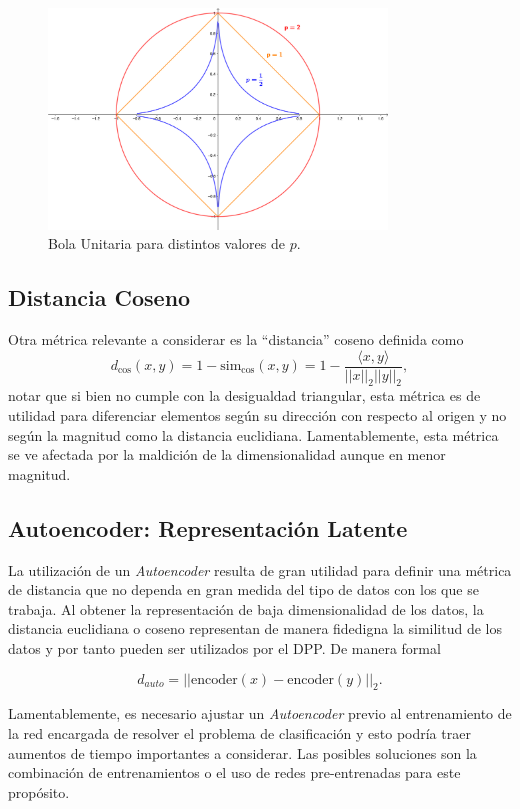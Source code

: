\begin{figure}[ht]
    \centering
    \includegraphics[width=9cm]{img/tesis/bola_unitaria.png}
    \caption{Bola Unitaria para distintos valores de $p$.}
    \label{fig:2d_unit_balls}
\end{figure}

\subsection{Distancia Coseno}

Otra métrica relevante a considerar es la ``distancia'' coseno definida como 
\[
d_{\text{cos}}(x,y) = 1 - \text{sim}_{\text{cos}}(x,y) = 1 - \frac{\langle x,y \rangle}{||x||_2||y||_2} , 
\]
notar que si bien no cumple con la desigualdad triangular, esta métrica es de utilidad para diferenciar elementos según su dirección con respecto al origen y no según la magnitud como la distancia euclidiana. Lamentablemente, esta métrica se ve afectada por la maldición de la dimensionalidad aunque en menor magnitud. 


\subsection{Autoencoder: Representación Latente}

La utilización de un \textit{Autoencoder} resulta de gran utilidad para definir una métrica de distancia que no dependa en gran medida del tipo de datos con los que se trabaja. Al obtener la representación de baja dimensionalidad de los datos, la distancia euclidiana o coseno representan de manera fidedigna la similitud de los datos y por tanto pueden ser utilizados por el DPP. De manera formal 

\[
d_{auto} = || \text{encoder}(x) - \text{encoder}(y) ||_2 .
\]

Lamentablemente, es necesario ajustar un \textit{Autoencoder} previo al entrenamiento de la red encargada de resolver el problema de clasificación y esto podría traer aumentos de tiempo importantes a considerar. Las posibles soluciones son la combinación de entrenamientos o el uso de redes pre-entrenadas para este propósito.   

